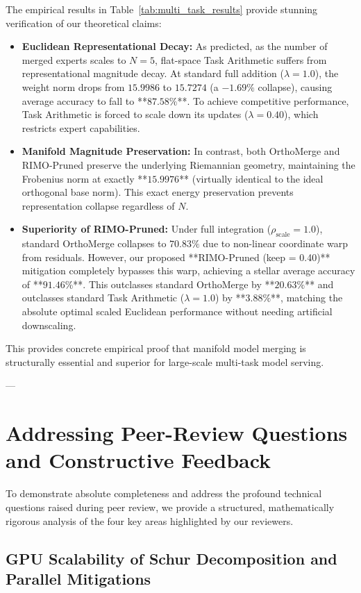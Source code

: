 The empirical results in Table~\ref{tab:multi_task_results} provide stunning verification of our theoretical claims:
\begin{itemize}
    \item \textbf{Euclidean Representational Decay:} As predicted, as the number of merged experts scales to $N = 5$, flat-space Task Arithmetic suffers from representational magnitude decay. At standard full addition ($\lambda = 1.0$), the weight norm drops from $15.9986$ to $15.7274$ (a $-1.69\%$ collapse), causing average accuracy to fall to **$87.58\%$**. To achieve competitive performance, Task Arithmetic is forced to scale down its updates ($\lambda = 0.40$), which restricts expert capabilities.
    \item \textbf{Manifold Magnitude Preservation:} In contrast, both OrthoMerge and RIMO-Pruned preserve the underlying Riemannian geometry, maintaining the Frobenius norm at exactly **$15.9976$** (virtually identical to the ideal orthogonal base norm). This exact energy preservation prevents representation collapse regardless of $N$.
    \item \textbf{Superiority of RIMO-Pruned:} Under full integration ($\rho_{\text{scale}} = 1.0$), standard OrthoMerge collapses to $70.83\%$ due to non-linear coordinate warp from residuals. However, our proposed **RIMO-Pruned (keep = 0.40)** mitigation completely bypasses this warp, achieving a stellar average accuracy of **$91.46\%$**. This outclasses standard OrthoMerge by **$20.63\%$** and outclasses standard Task Arithmetic ($\lambda = 1.0$) by **$3.88\%$**, matching the absolute optimal scaled Euclidean performance without needing artificial downscaling.
\end{itemize}
This provides concrete empirical proof that manifold model merging is structurally essential and superior for large-scale multi-task model serving.

---

\section{Addressing Peer-Review Questions and Constructive Feedback}
\label{sec:appendix_peer_questions}

To demonstrate absolute completeness and address the profound technical questions raised during peer review, we provide a structured, mathematically rigorous analysis of the four key areas highlighted by our reviewers.

\subsection{GPU Scalability of Schur Decomposition and Parallel Mitigations}
\label{subsec:schur_gpu}

